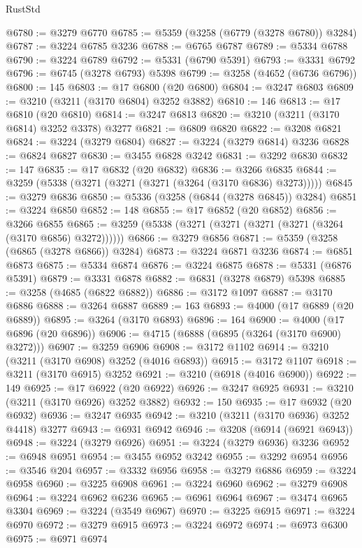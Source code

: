 \begin{lexlean}{RustStd}
\begin{coremodule}
@6780 := @3279 @6770
@6785 := @5359 (@3258 (@6779 (@3278 @6780)) @3284)
@6787 := @3224 @6785 @3236
@6788 := @6765 @6787
@6789 := @5334 @6788
@6790 := @3224 @6789
@6792 := @5331 (@6790 @5391)
@6793 := @3331 @6792
@6796 := @6745 (@3278 @6793) @5398
@6799 := @3258 (@4652 (@6736 @6796))
@6800 := 145
@6803 := @17 @6800 (@20 @6800)
@6804 := @3247 @6803
@6809 := @3210 (@3211 (@3170 @6804) @3252 @3882)
@6810 := 146
@6813 := @17 @6810 (@20 @6810)
@6814 := @3247 @6813
@6820 := @3210 (@3211 (@3170 @6814) @3252 @3378) @3277
@6821 := @6809 @6820
@6822 := @3208 @6821
@6824 := @3224 (@3279 @6804)
@6827 := @3224 (@3279 @6814) @3236
@6828 := @6824 @6827
@6830 := @3455 @6828 @3242
@6831 := @3292 @6830
@6832 := 147
@6835 := @17 @6832 (@20 @6832)
@6836 := @3266 @6835
@6844 := @3259 (@5338 (@3271 (@3271 (@3271 (@3264 (@3170 @6836) @3273)))))
@6845 := @3279 @6836
@6850 := @5336 (@3258 (@6844 (@3278 @6845)) @3284)
@6851 := @3224 @6850
@6852 := 148
@6855 := @17 @6852 (@20 @6852)
@6856 := @3266 @6855
@6865 := @3259 (@5338 (@3271 (@3271 (@3271 (@3271 (@3264 (@3170 @6856) @3272))))))
@6866 := @3279 @6856
@6871 := @5359 (@3258 (@6865 (@3278 @6866)) @3284)
@6873 := @3224 @6871 @3236
@6874 := @6851 @6873
@6875 := @5334 @6874
@6876 := @3224 @6875
@6878 := @5331 (@6876 @5391)
@6879 := @3331 @6878
@6882 := @6831 (@3278 @6879) @5398
@6885 := @3258 (@4685 (@6822 @6882))
@6886 := @3172 @1097
@6887 := @3170 @6886
@6888 := @3264 @6887
@6889 := 163
@6893 := @4000 (@17 @6889 (@20 @6889))
@6895 := @3264 (@3170 @6893)
@6896 := 164
@6900 := @4000 (@17 @6896 (@20 @6896))
@6906 := @4715 (@6888 (@6895 (@3264 (@3170 @6900) @3272)))
@6907 := @3259 @6906
@6908 := @3172 @1102
@6914 := @3210 (@3211 (@3170 @6908) @3252 (@4016 @6893))
@6915 := @3172 @1107
@6918 := @3211 (@3170 @6915) @3252
@6921 := @3210 (@6918 (@4016 @6900))
@6922 := 149
@6925 := @17 @6922 (@20 @6922)
@6926 := @3247 @6925
@6931 := @3210 (@3211 (@3170 @6926) @3252 @3882)
@6932 := 150
@6935 := @17 @6932 (@20 @6932)
@6936 := @3247 @6935
@6942 := @3210 (@3211 (@3170 @6936) @3252 @4418) @3277
@6943 := @6931 @6942
@6946 := @3208 (@6914 (@6921 @6943))
@6948 := @3224 (@3279 @6926)
@6951 := @3224 (@3279 @6936) @3236
@6952 := @6948 @6951
@6954 := @3455 @6952 @3242
@6955 := @3292 @6954
@6956 := @3546 @204
@6957 := @3332 @6956
@6958 := @3279 @6886
@6959 := @3224 @6958
@6960 := @3225 @6908
@6961 := @3224 @6960
@6962 := @3279 @6908
@6964 := @3224 @6962 @6236
@6965 := @6961 @6964
@6967 := @3474 @6965 @3304
@6969 := @3224 (@3549 @6967)
@6970 := @3225 @6915
@6971 := @3224 @6970
@6972 := @3279 @6915
@6973 := @3224 @6972
@6974 := @6973 @6300
@6975 := @6971 @6974

\end{coremodule}
\end{lexlean}
